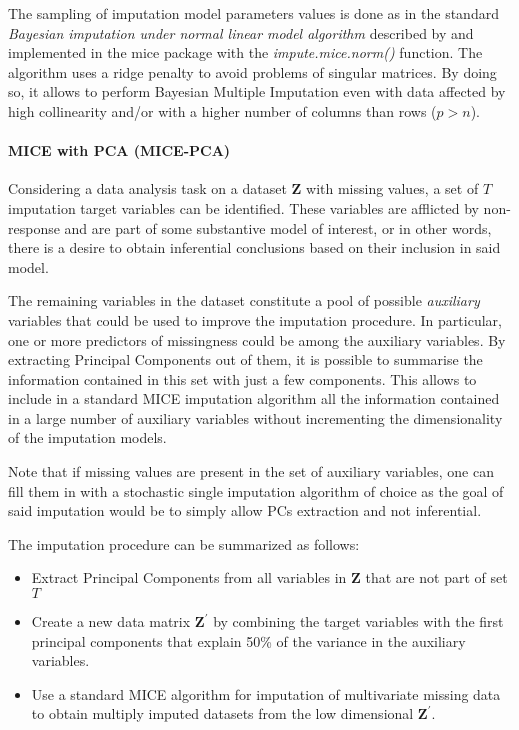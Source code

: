 	The sampling of imputation model parameters 
	values is done as in the standard \emph{Bayesian imputation under normal linear model algorithm} described by
	\citep[p. 68, algorithm 3.1]{vanBuuren:2012} and implemented in the mice package with the \emph{impute.mice.norm()}
	function. The algorithm uses a ridge penalty to avoid problems of singular matrices. By doing so, it allows to 
	perform Bayesian Multiple Imputation even with data affected by high collinearity and/or with a higher number 
	of columns than rows ($p > n$).

\paragraph{MICE with PCA (MICE-PCA)}
	Considering a data analysis task on a dataset $\bm{Z}$ with missing values, a set of $T$ imputation target 
	variables can be identified. These variables are afflicted by non-response and are part of some substantive
	model of interest, or in other words, there is a desire to obtain inferential conclusions based on their 
	inclusion in said model.

	The remaining variables in the dataset constitute a pool of possible \emph{auxiliary} variables that
	could be used to improve the imputation procedure. In particular, one or more predictors of missingness 
	could be among the auxiliary variables. By extracting Principal Components out of them, it is possible
	to summarise the information contained in this set with just a few components. This allows to include in
	a standard MICE imputation algorithm all the information contained in a large number of auxiliary variables
	without incrementing the dimensionality of the imputation models.

	Note that if missing values are present in the set of auxiliary variables, one can fill them in with a 
	stochastic single imputation algorithm of choice as the goal of said imputation would be to simply
	allow PCs extraction and not inferential.

	The imputation procedure can be summarized as follows:

	\begin{itemize}

	\item Extract Principal Components from all variables in $\bm{Z}$ that are not part of set $T$
	\item Create a new data matrix $\bm{Z}^{'}$ by combining the target variables with the first principal
		components that explain 50\% of the variance in the auxiliary variables.
	\item Use a standard MICE algorithm for imputation of multivariate missing data to obtain multiply
		imputed datasets from the low dimensional $\bm{Z}^{'}$.
	\end{itemize}

